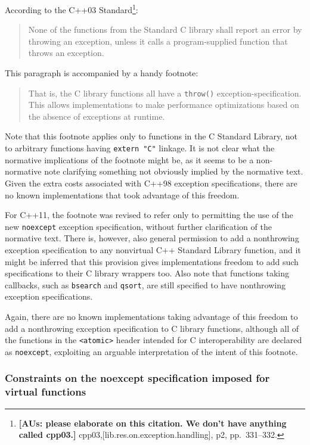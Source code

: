 According to the C++03 Standard{\cprotect\footnote{\textbf{[AUs: please elaborate on this citation. We don't have anything called cpp03.]} cpp03,[lib.res.on.exception.handling], p2, pp.~331--332.}}:
\begin{quote}
None of the functions from the Standard C library shall report an error by
 throwing an exception, unless it calls a program-supplied function that
 throws an exception.
\end{quote}
This paragraph is accompanied by a handy footnote:
\begin{quote}
That is, the C library functions all have a \lstinline!throw()! exception-specification.
 This allows implementations to make performance optimizations based on the
 absence of exceptions at runtime.
\end{quote}
Note that this footnote applies only to functions in the C Standard
Library, not to arbitrary functions having \lstinline!extern!~\lstinline!"C"!
linkage. It is not clear what the normative implications of the footnote
might be, as it seems to be a non-normative note clarifying something
not obviously implied by the normative text. Given the extra costs
associated with C++98 exception specifications, there are no known
implementations that took advantage of this freedom.

For C++11, the footnote was revised to refer only to permitting the use
of the new \lstinline!noexcept! exception specification, without further
clarification of the normative text. There is, however, also general
permission to add a nonthrowing exception specification to any
nonvirtual C++ Standard Library function, and it might be inferred that
this provision gives implementations freedom to add such specifications
to their C library wrappers too. Also note that functions taking
callbacks, such as \lstinline!bsearch! and \lstinline!qsort!, are still
specified to have nonthrowing exception specifications.

Again, there are no known implementations taking advantage of this
freedom to add a nonthrowing exception specification to C library
functions, although all of the functions in the \lstinline!<atomic>! header
intended for C interoperability are declared as \lstinline!noexcept!,
exploiting an arguable interpretation of the intent of this footnote.

\subsubsection[Constraints on the \lstinline!noexcept! specification imposed for \lstinline!virtual! functions]{Constraints on the {\SubsubsecCode noexcept} specification imposed for {\SubsubsecCode virtual} functions}\label{constraints-on-the-noexcept-specification-imposed-for-virtual-functions}

